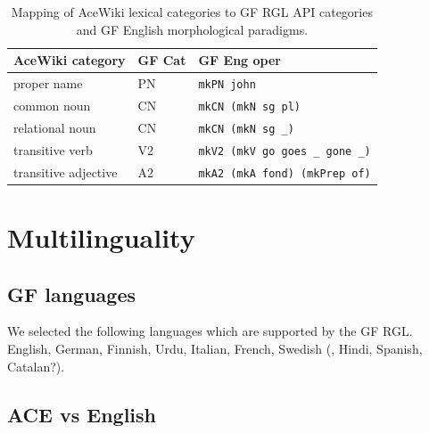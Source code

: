 \documentclass[a4paper]{article}
\def\xp#1{\texttt{#1}}
\begin{document}
\begin{table}
\begin{center}
\caption{Mapping of AceWiki lexical categories
to GF RGL API categories and GF English
morphological paradigms.\protect\label{mapping_acewiki_to_gf}}
\begin{tabular}{ l l l }
\hline
AceWiki category & GF Cat & GF Eng oper \\
\hline
proper name & PN & \xp{mkPN john} \\
common noun & CN & \xp{mkCN (mkN sg pl)} \\
relational noun & CN & \xp{mkCN (mkN sg \_)} \\
transitive verb & V2 & \xp{mkV2 (mkV go goes \_ gone \_)} \\
transitive adjective & A2 & \xp{mkA2 (mkA fond) (mkPrep of)} \\
\hline
\end{tabular}
\end{center}
\end{table}

%
%

\section{Multilinguality}

\subsection{GF languages}

We selected the following languages which are supported by the GF RGL.
English, German, Finnish, Urdu, Italian, French, Swedish
(, Hindi, Spanish, Catalan?).

\subsection{ACE vs English}
\end{document}
